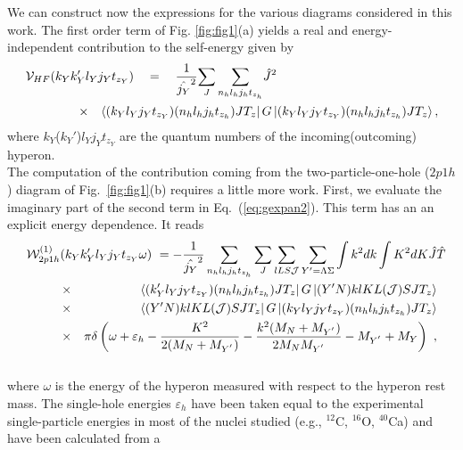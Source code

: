 We can construct now the expressions for the
various diagrams considered in this work. The first order term 
of Fig. \ref{fig:fig1}(a) yields
a real and energy-independent contribution to the self-energy given by
\begin{eqnarray}
\lefteqn{  {\cal V}_{HF}(k_{Y}k_{Y}'l_{Y}j_{Y}
   t_{z_{Y}})\quad = \quad \frac{1}{\hat{j_{Y}}^2}
  {\displaystyle \sum_{J}\sum_{n_hl_hj_ht_{z_h}}}\hat{J}^2}\hspace{1.5cm}
\nonumber \\
  & \times & \left\langle
(k_{Y}l_{Y}j_{Y}t_{z_{Y}})
  (n_hl_hj_ht_{z_h})JT_z \right |
   G\left | (k_{Y}l_{Y}j_{Y}t_{z_{Y}})
   (n_hl_hj_ht_{z_h})JT_z \right \rangle ,
\label{eq:hf}
\end{eqnarray} 
where $k_{Y}$($k_{Y}'$)$l_{Y}$$j_{Y}$$t_{z_{Y}}$ are
the quantum numbers of the incoming(outcoming) hyperon. \\
The computation of the contribution coming from the 
two-particle-one-hole ($2p1h$) diagram of Fig.~\ref{fig:fig1}(b)
requires a little more work. First, we evaluate the imaginary part of the 
second term in Eq.\ (\ref{eq:gexpan2}). This term has an
an explicit energy dependence. It reads   
\begin{eqnarray}
\lefteqn{{\cal W}^{(1)}_{2p1h}(k_{Y}k_{Y}'l_{Y}j_{Y}
      t_{z_{Y}}\omega) \ = 
      {\displaystyle -\frac{1}
      {\hat{j_{Y}}^2}\sum_{n_hl_hj_ht_{z_h}}
      \sum_{J}\sum_{lLS{\cal J}}\sum_{Y'=\Lambda\Sigma}\int k^{2}dk
      \int K^{2}dK\hat{J}\hat{T}}}\hspace{1cm}\nonumber \\
      &\times& \left\langle (k_{Y}'l_{Y}j_{Y}
      t_{z_{Y}})(n_hl_hj_ht_{z_h})JT_z\right |
      G\left | (Y'N)klKL({\cal J})SJT_z \right \rangle\nonumber \\
      &\times& \left\langle (Y'N)klKL({\cal J})SJT_z \right | G
      \left | (k_{Y}l_{Y}j_{Y}
      t_{z_{Y}})(n_hl_hj_ht_{z_h})JT_z \right \rangle \nonumber
      \\ &\times& \pi\delta
      \left(\omega +\varepsilon_h -\frac{K^2}{2(M_N+M_{Y^{'}})} -
      \frac{k^2(M_N+M_{Y^{'}})}{2M_NM_{Y^{'}}}-M_{Y^{'}}+M_Y \right) \ ,
   \label{eq:2p1h}
\end{eqnarray} \\
where $\omega$ is the energy of the hyperon measured with respect
to the hyperon rest mass. The single-hole energies $\varepsilon_{h}$ have
been taken equal to the
experimental single-particle energies in most of the nuclei studied (e.g.,
$^{12}$C, $^{16}$O, $^{40}$Ca) and have been calculated from a
